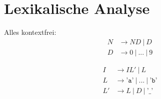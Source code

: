 \chapter{Lexikalische Analyse}
Alles kontextfrei:
\begin{align*}
 N &\to ND\ |\ D \tag{für natürliche Zahlen}\\
 D &\to 0\ |\ ...\ |\ 9
\end{align*}

\begin{align*}
 I &\to IL'\ |\ L \tag{für Bezeichner}\\
 L &\to \texttt{'a'}\ |\ ...\ |\ \texttt{'b'}\\
 L' &\to L\ |\ D\ |\ \texttt{'\_'}
\end{align*}
